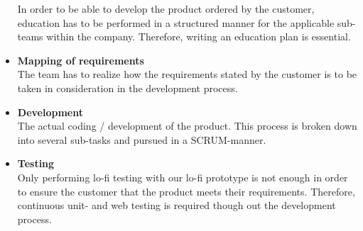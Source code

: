 \begin{itemize}
    In order to be able to develop the product ordered by the customer, education has to be performed in a structured manner for the applicable sub-teams within the company. Therefore, writing an education plan is essential. 
    \item{\textbf{Mapping of requirements}} \\
    The team has to realize how the requirements stated by the customer is to be taken in consideration in the development process. 
    \item{\textbf{Development}} \\
    The actual coding / development of the product. This process is broken down into several sub-tasks and pursued in a SCRUM-manner. 
    
    \item{\textbf{Testing}} \\
    Only performing lo-fi testing with our lo-fi prototype is not enough in order to ensure the customer that the product meets their requirements. Therefore, continuous unit- and web testing is required though out the development process. 

\end{itemize}






